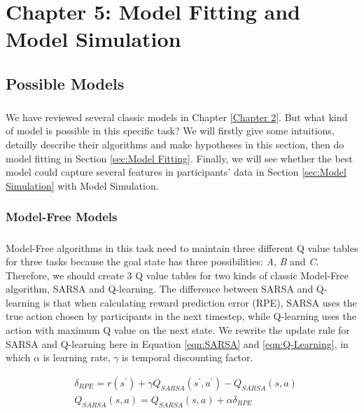 
\chapter{Chapter 5: Model Fitting and Model Simulation} %

\label{Chapter 5} %

\section{Possible Models}
\label{sec:Possible Models}
\paragraph{}
We have reviewed several classic models in Chapter \ref{Chapter 2}. But what kind of model is possible in this specific task? We will firstly give some intuitions, detailly describe their algorithms and make hypotheses in this section, then do model fitting in Section \ref{sec:Model Fitting}. Finally, we will see whether the best model could capture several features in participants' data in Section \ref{sec:Model Simulation} with Model Simulation. 

\subsection{Model-Free Models}
\paragraph{}
Model-Free algorithms in this task need to maintain three different Q value tables for three tasks because the goal state has three possibilities: \emph{A}, \emph{B} and \emph{C}. Therefore, we should create 3 Q value tables for two kinds of classic Model-Free algorithm, SARSA and Q-learning. The difference between SARSA and Q-learning is that when calculating reward prediction error (RPE), SARSA uses the true action chosen by participants in the next timestep, while Q-learning uses the action with maximum Q value on the next state. We rewrite the update rule for SARSA and Q-learning here in Equation \ref{eqn:SARSA} and \ref{eqn:Q-Learning}, in which $\alpha$ is learning rate, $\gamma$ is temporal discounting factor. 

\begin{equation}
\begin{aligned}
&\delta_{RPE}=r(s^{\prime})+\gamma Q_{SARSA}(s^{\prime}, a^{\prime})-Q_{SARSA}(s,a) \\
&Q_{SARSA}(s,a)=Q_{SARSA}(s,a)+\alpha \delta_{RPE} \\
\end{aligned}
\label{eqn:SARSA}
\end{equation}

